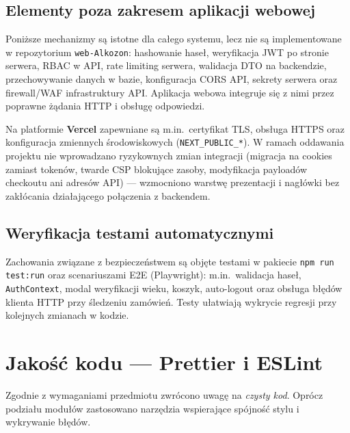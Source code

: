 \documentclass[12pt,a4paper]{report}
\newcommand{\blok}[1]{\needspace{9\baselineskip}#1}
\newenvironment{calosc}{%
  \Needspace{17\baselineskip}%
  \begin{samepage}%
}{%
  \end{samepage}%
}
\begin{document}
\begin{calosc}
\section{Elementy poza zakresem aplikacji webowej}

Poniższe mechanizmy są istotne dla całego systemu, lecz nie są implementowane w repozytorium \texttt{web-Alkozon}: hashowanie haseł, weryfikacja JWT po stronie serwera, RBAC w API, rate limiting serwera, walidacja DTO na backendzie, przechowywanie danych w bazie, konfiguracja CORS API, sekrety serwera oraz firewall/WAF infrastruktury API. Aplikacja webowa integruje się z nimi przez poprawne żądania HTTP i obsługę odpowiedzi.

Na platformie \textbf{Vercel} zapewniane są m.in.\ certyfikat TLS, obsługa HTTPS oraz konfiguracja zmiennych środowiskowych (\texttt{NEXT\_PUBLIC\_*}). W ramach oddawania projektu nie wprowadzano ryzykownych zmian integracji (migracja na cookies zamiast tokenów, twarde CSP blokujące zasoby, modyfikacja payloadów checkoutu ani adresów API) --- wzmocniono warstwę prezentacji i nagłówki bez zakłócania działającego połączenia z backendem.
\end{calosc}

\begin{calosc}
\section{Weryfikacja testami automatycznymi}

Zachowania związane z bezpieczeństwem są objęte testami w pakiecie \texttt{npm run test:run} oraz scenariuszami E2E (Playwright): m.in.\ walidacja haseł, \texttt{AuthContext}, modal weryfikacji wieku, koszyk, auto-logout oraz obsługa błędów klienta HTTP przy śledzeniu zamówień. Testy ułatwiają wykrycie regresji przy kolejnych zmianach w kodzie.
\end{calosc}

\chapter{Jakość kodu --- Prettier i ESLint}

\blok{%
Zgodnie z wymaganiami przedmiotu zwrócono uwagę na \emph{czysty kod}. Oprócz podziału modułów zastosowano narzędzia wspierające spójność stylu i wykrywanie błędów.
}
\end{document}
